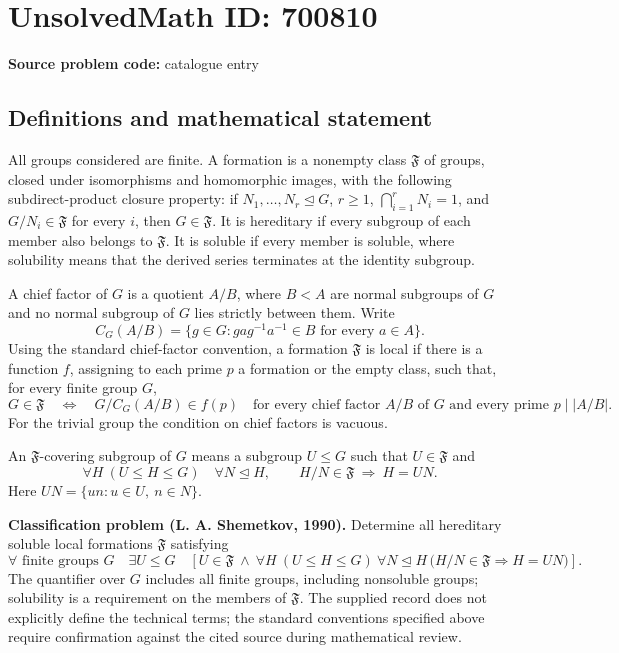 \documentclass[11pt]{article}
\begin{document}
\section*{UnsolvedMath ID: 700810}
\textbf{Source problem code:} catalogue entry
\subsection{Definitions and mathematical statement}
All groups considered are finite. A formation is a nonempty class \(\mathfrak F\) of groups, closed under isomorphisms and homomorphic images, with the following subdirect-product closure property: if \(N_1,\ldots,N_r\trianglelefteq G\), \(r\geq 1\), \(\bigcap_{i=1}^r N_i=1\), and \(G/N_i\in\mathfrak F\) for every \(i\), then \(G\in\mathfrak F\). It is hereditary if every subgroup of each member also belongs to \(\mathfrak F\). It is soluble if every member is soluble, where solubility means that the derived series terminates at the identity subgroup.

A chief factor of \(G\) is a quotient \(A/B\), where \(B<A\) are normal subgroups of \(G\) and no normal subgroup of \(G\) lies strictly between them. Write
\[
C_G(A/B)=\{g\in G: gag^{-1}a^{-1}\in B\text{ for every }a\in A\}.
\]
Using the standard chief-factor convention, a formation \(\mathfrak F\) is local if there is a function \(f\), assigning to each prime \(p\) a formation or the empty class, such that, for every finite group \(G\),
\[
G\in\mathfrak F
\quad\Longleftrightarrow\quad
G/C_G(A/B)\in f(p)
\quad\text{for every chief factor }A/B\text{ of }G
\text{ and every prime }p\mid |A/B|.
\]
For the trivial group the condition on chief factors is vacuous.

An \(\mathfrak F\)-covering subgroup of \(G\) means a subgroup \(U\leq G\) such that \(U\in\mathfrak F\) and
\[
\forall H\ (U\leq H\leq G)\quad
\forall N\trianglelefteq H,\qquad
H/N\in\mathfrak F\ \Longrightarrow\ H=UN.
\]
Here \(UN=\{un:u\in U,\ n\in N\}\).

\textbf{Classification problem (L. A. Shemetkov, 1990).} Determine all hereditary soluble local formations \(\mathfrak F\) satisfying
\[
\forall\text{ finite groups }G\quad
\exists U\leq G\quad
\left[
U\in\mathfrak F\ \land\
\forall H\ (U\leq H\leq G)\ 
\forall N\trianglelefteq H\,
\bigl(H/N\in\mathfrak F\Longrightarrow H=UN\bigr)
\right].
\]
The quantifier over \(G\) includes all finite groups, including nonsoluble groups; solubility is a requirement on the members of \(\mathfrak F\). The supplied record does not explicitly define the technical terms; the standard conventions specified above require confirmation against the cited source during mathematical review.
\end{document}
